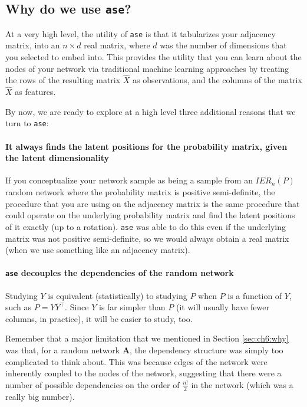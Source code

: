 \subsection{Why do we use \texttt{ase}?}
\label{sec:ch6:ase:whyuse}
At a very high level, the utility of \texttt{ase} is that it tabularizes your adjacency matrix, into an $n \times d$ real matrix, where $d$ was the number of dimensions that you selected to embed into. This provides the utility that you can learn about the nodes of your network via traditional machine learning approaches by treating the rows of the resulting matrix $\hat X$ as observations, and the columns of the matrix $\hat X$ as features. 

By now, we are ready to explore at a high level three additional reasons that we turn to \texttt{ase}:

\paragraph*{It always finds the latent positions for the probability matrix, given the latent dimensionality}

If you conceptualize your network sample as being a sample from an $IER_n(P)$ random network where the probability matrix is positive semi-definite, the procedure that you are using on the adjacency matrix is the same procedure that could operate on the underlying probability matrix and find the latent positions of it exactly (up to a rotation). \texttt{ase} was able to do this even if the underlying matrix was not positive semi-definite, so we would always obtain a real matrix (when we use something like an adjacency matrix).

\paragraph*{\texttt{ase} decouples the dependencies of the random network}

Studying $Y$ is equivalent (statistically) to studying $P$ when $P$ is a function of $Y$, such as $P = YY^\top$. Since $Y$ is far simpler than $P$ (it will usually have fewer columns, in practice), it will be easier to study, too.

Remember that a major limitation that we mentioned in Section \ref{sec:ch6:why} was that, for a random network $\mathbf A$, the dependency structure was simply too complicated to think about. This was because edges of the network were inherently coupled to the nodes of the network, suggesting that there were a number of possible dependencies on the order of $\frac{n!}{2}$ in the network (which was a really big number).

